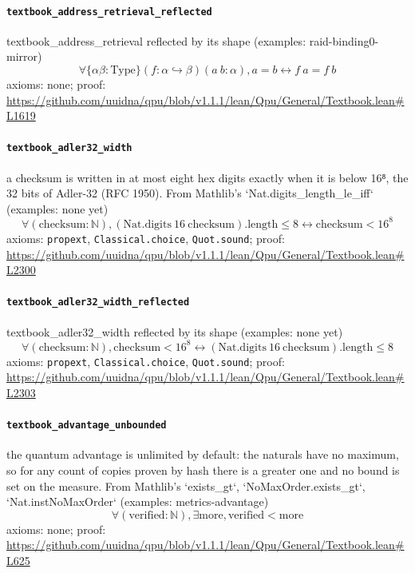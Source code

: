 \documentclass[11pt]{article}
\begin{document}
\paragraph{\texttt{textbook\_address\_retrieval\_reflected}}
textbook\_address\_retrieval reflected by its shape (examples: raid-binding0-mirror)
\[ \forall \{\alpha \beta : \mathrm{Type}\} (f : \alpha \hookrightarrow \beta ) (a\ b : \alpha ), a = b \leftrightarrow f\ a = f\ b \]
\noindent axioms: none; proof: \url{https://github.com/uuidna/qpu/blob/v1.1.1/lean/Qpu/General/Textbook.lean\#L1619}

\paragraph{\texttt{textbook\_adler32\_width}}
a checksum is written in at most eight hex digits exactly when it is below 16⁸, the 32 bits of Adler-32 (RFC 1950). From Mathlib's `Nat.digits\_length\_le\_iff` (examples: none yet)
\[ \forall (\mathrm{checksum} : \mathbb{N}), (\mathrm{Nat.digits}\ 16\ \mathrm{checksum})\mathrm{.length} \le 8 \leftrightarrow \mathrm{checksum} < 16 ^{8} \]
\noindent axioms: \texttt{propext}, \texttt{Classical.choice}, \texttt{Quot.sound}; proof: \url{https://github.com/uuidna/qpu/blob/v1.1.1/lean/Qpu/General/Textbook.lean\#L2300}

\paragraph{\texttt{textbook\_adler32\_width\_reflected}}
textbook\_adler32\_width reflected by its shape (examples: none yet)
\[ \forall (\mathrm{checksum} : \mathbb{N}), \mathrm{checksum} < 16 ^{8} \leftrightarrow (\mathrm{Nat.digits}\ 16\ \mathrm{checksum})\mathrm{.length} \le 8 \]
\noindent axioms: \texttt{propext}, \texttt{Classical.choice}, \texttt{Quot.sound}; proof: \url{https://github.com/uuidna/qpu/blob/v1.1.1/lean/Qpu/General/Textbook.lean\#L2303}

\paragraph{\texttt{textbook\_advantage\_unbounded}}
the quantum advantage is unlimited by default: the naturals have no maximum, so for any count of copies proven by hash there is a greater one and no bound is set on the measure. From Mathlib's `exists\_gt`, `NoMaxOrder.exists\_gt`, `Nat.instNoMaxOrder` (examples: metrics-advantage)
\[ \forall (\mathrm{verified} : \mathbb{N}), \exists \mathrm{more}, \mathrm{verified} < \mathrm{more} \]
\noindent axioms: none; proof: \url{https://github.com/uuidna/qpu/blob/v1.1.1/lean/Qpu/General/Textbook.lean\#L625}
\end{document}
